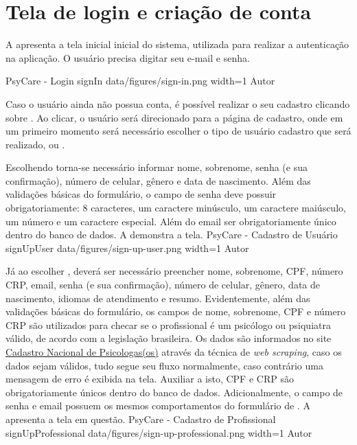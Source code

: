 \section{Tela de login e criação de conta}
\label{sec:loginCriacao}

A  apresenta a tela inicial inicial do sistema, utilizada para realizar a autenticação na aplicação. O usuário precisa digitar seu e-mail e senha.

\image
    {PsyCare - Login}
    {signIn}
    {data/figures/sign-in.png}
    {width=1\textwidth}
    {Autor}

Caso o usuário ainda não possua conta, é possível realizar o seu cadastro clicando sobre . Ao clicar, o usuário será direcionado para a página de cadastro, onde em um primeiro momento será necessário escolher o tipo de usuário cadastro que será realizado,  ou . 

Escolhendo  torna-se necessário informar nome, sobrenome, senha (e sua confirmação), número de celular, gênero e data de nascimento. Além das validações básicas do formulário, o campo de senha deve possuir obrigatoriamente: 8 caracteres, um caractere minúsculo, um caractere maiúsculo, um número e um caractere especial. Além do email ser obrigatoriamente único dentro do banco de dados. A  demonstra a tela.
\image
    {PsyCare - Cadastro de Usuário}
    {signUpUser}
    {data/figures/sign-up-user.png}
    {width=1\textwidth}
    {Autor}

Já ao escolher , deverá ser necessário preencher nome, sobrenome, CPF, número CRP, email, senha (e sua confirmação), número de celular, gênero, data de nascimento, idiomas de atendimento e resumo. Evidentemente, além das validações básicas do formulário, os campos de nome, sobrenome, CPF e número CRP são utilizados para checar se o profissional é um psicólogo ou psiquiatra válido, de acordo com a legislação brasileira. Os dados são informados no site \href{https://cadastro.cfp.org.br/}{Cadastro Nacional de Psicologas(os)} através da técnica de \textit{web scraping}, caso os dados sejam válidos, tudo segue seu fluxo normalmente, caso contrário uma mensagem de erro é exibida na tela. Auxiliar a isto, CPF e CRP são obrigatoriamente únicos dentro do banco de dados. Adicionalmente, o campo de senha e email possuem os mesmos comportamentos do formulário de . A  apresenta a tela em questão.
\image
    {PsyCare - Cadastro de Profissional}
    {signUpProfessional}
    {data/figures/sign-up-professional.png}
    {width=1\textwidth}
    {Autor}